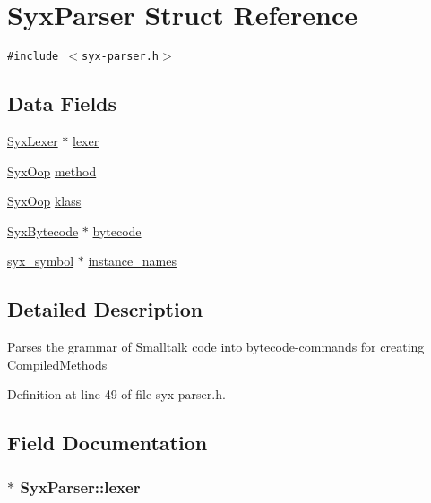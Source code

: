 \hypertarget{struct_syx_parser}{
\section{SyxParser Struct Reference}
\label{struct_syx_parser}
}
{\tt \#include $<$syx-parser.h$>$}

\subsection*{Data Fields}
\begin{CompactItemize}
\item 
\hyperlink{struct_syx_lexer}{SyxLexer} $\ast$ \hyperlink{struct_syx_parser_7e3cac3a7e91eb1bc0076981daef1568}{lexer}
\item 
\hyperlink{syx-types_8h_1121caba2d40b2ce090b640762744ccd}{SyxOop} \hyperlink{struct_syx_parser_142af50e1b05b7a5709b07781f40c9aa}{method}
\item 
\hyperlink{syx-types_8h_1121caba2d40b2ce090b640762744ccd}{SyxOop} \hyperlink{struct_syx_parser_e0f443e4febc0a9c32b5b8a2db4af651}{klass}
\item 
\hyperlink{struct_syx_bytecode}{SyxBytecode} $\ast$ \hyperlink{struct_syx_parser_8c501f2674cef13a7c57b17dd12da0a9}{bytecode}
\item 
\hyperlink{syx-types_8h_9663af54b7b72f5d8be5f754ef356525}{syx\_\-symbol} $\ast$ \hyperlink{struct_syx_parser_073d58efe7b5816532014aed095179ec}{instance\_\-names}
\end{CompactItemize}


\subsection{Detailed Description}
Parses the grammar of Smalltalk code into bytecode-commands for creating CompiledMethods 

Definition at line 49 of file syx-parser.h.

\subsection{Field Documentation}
\hypertarget{struct_syx_parser_7e3cac3a7e91eb1bc0076981daef1568}{
\subsubsection{$\ast$ {\bf SyxParser::lexer}}}
\label{struct_syx_parser_7e3cac3a7e91eb1bc0076981daef1568}




